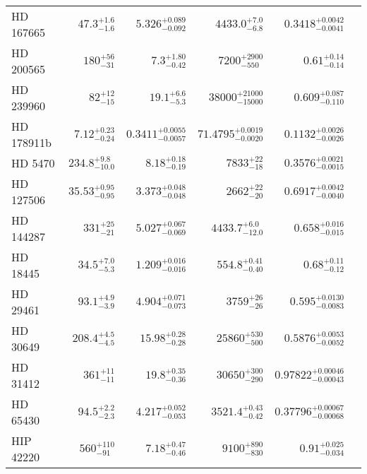 \begin{longtable*}{lrrrrr}
HD 167665 & $47.3^{+1.6}_{-1.6}$ & $5.326^{+0.089}_{-0.092}$ & $4433.0^{+7.0}_{-6.8}$ & $0.3418^{+0.0042}_{-0.0041}$ \\ 
HD 200565 & $180^{+56}_{-31}$ & $7.3^{+1.80}_{-0.42}$ & $7200^{+2900}_{-550}$ & $0.61^{+0.14}_{-0.14}$ \\ 
HD 239960 & $82^{+12}_{-15}$ & $19.1^{+6.6}_{-5.3}$ & $38000^{+21000}_{-15000}$ & $0.609^{+0.087}_{-0.110}$ \\ 
HD 178911b & $7.12^{+0.23}_{-0.24}$ & $0.3411^{+0.0055}_{-0.0057}$ & $71.4795^{+0.0019}_{-0.0020}$ & $0.1132^{+0.0026}_{-0.0026}$ \\ 
HD 5470 & $234.8^{+9.8}_{-10.0}$ & $8.18^{+0.18}_{-0.19}$ & $7833^{+22}_{-18}$ & $0.3576^{+0.0021}_{-0.0015}$ \\ 
HD 127506 & $35.53^{+0.95}_{-0.95}$ & $3.373^{+0.048}_{-0.048}$ & $2662^{+22}_{-20}$ & $0.6917^{+0.0042}_{-0.0040}$ \\ 
HD 144287 & $331^{+25}_{-21}$ & $5.027^{+0.067}_{-0.069}$ & $4433.7^{+6.0}_{-12.0}$ & $0.658^{+0.016}_{-0.015}$ \\ 
HD 18445 & $34.5^{+7.0}_{-5.3}$ & $1.209^{+0.016}_{-0.016}$ & $554.8^{+0.41}_{-0.40}$ & $0.68^{+0.11}_{-0.12}$ \\ 
HD 29461 & $93.1^{+4.9}_{-3.9}$ & $4.904^{+0.071}_{-0.073}$ & $3759^{+26}_{-26}$ & $0.595^{+0.0130}_{-0.0083}$ \\ 
HD 30649 & $208.4^{+4.5}_{-4.5}$ & $15.98^{+0.28}_{-0.28}$ & $25860^{+530}_{-500}$ & $0.5876^{+0.0053}_{-0.0052}$ \\ 
HD 31412 & $361^{+11}_{-11}$ & $19.8^{+0.35}_{-0.36}$ & $30650^{+300}_{-290}$ & $0.97822^{+0.00046}_{-0.00043}$ \\ 
HD 65430 & $94.5^{+2.2}_{-2.3}$ & $4.217^{+0.052}_{-0.053}$ & $3521.4^{+0.43}_{-0.42}$ & $0.37796^{+0.00067}_{-0.00068}$ \\ 
HIP 42220 & $560^{+110}_{-91}$ & $7.18^{+0.47}_{-0.46}$ & $9100^{+890}_{-830}$ & $0.91^{+0.025}_{-0.034}$ \\ 
\bottomrule 
\end{longtable*} 
